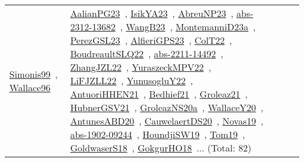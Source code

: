 {\begin{longtable}{lp{3cm}>{\raggedright\arraybackslash}p{6cm}>{\raggedright\arraybackslash}p{6cm}>{\raggedright\arraybackslash}p{8cm}}
\href{works/Simonis99.pdf}{Simonis99}~\cite{Simonis99}, \href{works/Wallace96.pdf}{Wallace96}~\cite{Wallace96} & \href{works/AalianPG23.pdf}{AalianPG23}~\cite{AalianPG23}, \href{works/IsikYA23.pdf}{IsikYA23}~\cite{IsikYA23}, \href{works/AbreuNP23.pdf}{AbreuNP23}~\cite{AbreuNP23}, \href{works/abs-2312-13682.pdf}{abs-2312-13682}~\cite{abs-2312-13682}, \href{works/WangB23.pdf}{WangB23}~\cite{WangB23}, \href{works/MontemanniD23a.pdf}{MontemanniD23a}~\cite{MontemanniD23a}, \href{works/PerezGSL23.pdf}{PerezGSL23}~\cite{PerezGSL23}, \href{works/AlfieriGPS23.pdf}{AlfieriGPS23}~\cite{AlfieriGPS23}, \href{works/ColT22.pdf}{ColT22}~\cite{ColT22}, \href{works/BoudreaultSLQ22.pdf}{BoudreaultSLQ22}~\cite{BoudreaultSLQ22}, \href{works/abs-2211-14492.pdf}{abs-2211-14492}~\cite{abs-2211-14492}, \href{works/ZhangJZL22.pdf}{ZhangJZL22}~\cite{ZhangJZL22}, \href{works/YuraszeckMPV22.pdf}{YuraszeckMPV22}~\cite{YuraszeckMPV22}, \href{works/LiFJZLL22.pdf}{LiFJZLL22}~\cite{LiFJZLL22}, \href{works/YunusogluY22.pdf}{YunusogluY22}~\cite{YunusogluY22}, \href{works/AntuoriHHEN21.pdf}{AntuoriHHEN21}~\cite{AntuoriHHEN21}, \href{works/Bedhief21.pdf}{Bedhief21}~\cite{Bedhief21}, \href{works/Groleaz21.pdf}{Groleaz21}~\cite{Groleaz21}, \href{works/HubnerGSV21.pdf}{HubnerGSV21}~\cite{HubnerGSV21}, \href{works/GroleazNS20a.pdf}{GroleazNS20a}~\cite{GroleazNS20a}, \href{works/WallaceY20.pdf}{WallaceY20}~\cite{WallaceY20}, \href{works/AntunesABD20.pdf}{AntunesABD20}~\cite{AntunesABD20}, \href{works/CauwelaertDS20.pdf}{CauwelaertDS20}~\cite{CauwelaertDS20}, \href{works/Novas19.pdf}{Novas19}~\cite{Novas19}, \href{works/abs-1902-09244.pdf}{abs-1902-09244}~\cite{abs-1902-09244}, \href{works/HoundjiSW19.pdf}{HoundjiSW19}~\cite{HoundjiSW19}, \href{works/Tom19.pdf}{Tom19}~\cite{Tom19}, \href{works/GoldwaserS18.pdf}{GoldwaserS18}~\cite{GoldwaserS18}, \href{works/GokgurHO18.pdf}{GokgurHO18}~\cite{GokgurHO18}... (Total: 82)\\
\end{longtable}
}

